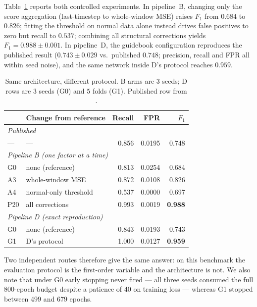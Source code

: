 \documentclass{article}
\begin{document}
Table~\ref{tab:protocol-effect} reports both controlled experiments. In
pipeline~B, changing only the score aggregation (last-timestep to whole-window
MSE) raises $F_1$ from $0.684$ to $0.826$; fitting the threshold on normal data
alone instead drives false positives to zero but recall to $0.537$; combining
all structural corrections yields $F_1 = 0.988 \pm 0.001$. In pipeline~D, the
guidebook configuration reproduces the published result
($0.743 \pm 0.029$ vs.\ published $0.748$; precision, recall and FPR all within
seed noise), and the same network inside D's protocol reaches $0.959$.

\begin{table}[t]
\caption{Same architecture, different protocol. B arms are $3$ seeds; D rows
are $3$ seeds (G0) and $5$ folds (G1). Published row from
\citet{kamp2022press}.}
\label{tab:protocol-effect}
\vskip 0.08in
\centering
\small
\setlength{\tabcolsep}{4pt}
\begin{tabular}{llrrr}
\toprule
 & Change from reference & Recall & FPR & $F_1$ \\
\midrule
\multicolumn{5}{l}{\textit{Published}} \\
\quad --- & --- & 0.856 & 0.0195 & 0.748 \\
\midrule
\multicolumn{5}{l}{\textit{Pipeline B (one factor at a time)}} \\
\quad G0 & none (reference)        & 0.813 & 0.0254 & 0.684 \\
\quad A3 & whole-window MSE        & 0.872 & 0.0108 & 0.826 \\
\quad A4 & normal-only threshold   & 0.537 & 0.0000 & 0.697 \\
\quad P20 & all corrections        & 0.993 & 0.0019 & \textbf{0.988} \\
\midrule
\multicolumn{5}{l}{\textit{Pipeline D (exact reproduction)}} \\
\quad G0 & none (reference)        & 0.843 & 0.0193 & 0.743 \\
\quad G1 & D's protocol            & 1.000 & 0.0127 & \textbf{0.959} \\
\bottomrule
\end{tabular}
\end{table}

Two independent routes therefore give the same answer: on this benchmark the
evaluation protocol is the first-order variable and the architecture is not.
We also note that under G0 early stopping never fired --- all three seeds
consumed the full 800-epoch budget despite a patience of 40 on training loss
--- whereas G1 stopped between 499 and 679 epochs.
\end{document}
